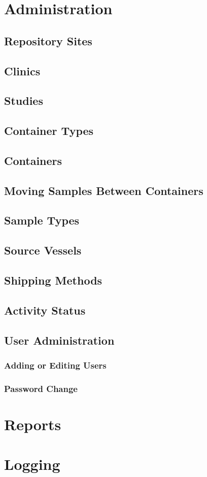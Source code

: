 \chapter{Administration}
\section{Repository Sites}
\section{Clinics}
\section{Studies}
\section{Container Types}
\section{Containers}
\section{Moving Samples Between Containers}
\section{Sample Types}
\section{Source Vessels}
\section{Shipping Methods}
\section{Activity Status}
\section{User Administration}
\subsection{Adding or Editing Users}
\subsection{Password Change}
\chapter{Reports}
\chapter{Logging}
